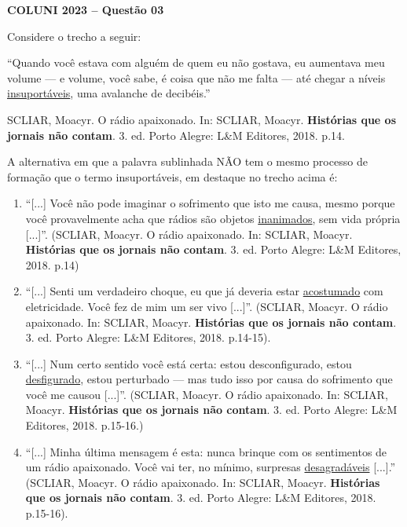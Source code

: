 \textbf{COLUNI 2023 -- Questão 03}\par\medskip Considere o trecho a seguir:

\par

“Quando você estava com alguém de quem eu não gostava, eu aumentava meu volume — e volume, você sabe, é coisa que não me falta — até chegar a níveis \underline{insuportáveis}, uma avalanche de decibéis.”

\par

SCLIAR, Moacyr. O rádio apaixonado. In: SCLIAR, Moacyr. \textbf{Histórias que os jornais não contam}. 3. ed. Porto Alegre: L\&M Editores, 2018. p.14.

\par

A alternativa em que a palavra sublinhada NÃO tem o mesmo processo de formação que o termo insuportáveis, em destaque no trecho acima é:\begin{enumerate}
\item “[...] Você não pode imaginar o sofrimento que isto me causa, mesmo porque você provavelmente acha
       que rádios são objetos \underline{inanimados}, sem vida própria [...]”. (SCLIAR, Moacyr. O rádio apaixonado. In: SCLIAR,
      Moacyr. \textbf{Histórias que os jornais não contam}. 3. ed. Porto Alegre: L\&M Editores, 2018. p.14)
\item “[...] Senti um verdadeiro choque, eu que já deveria estar \underline{acostumado} com eletricidade. Você fez de mim
       um ser vivo [...]”. (SCLIAR, Moacyr. O rádio apaixonado. In: SCLIAR, Moacyr. \textbf{Histórias que os jornais não contam}. 3. ed. Porto Alegre: L\&M Editores, 2018. p.14-15).
\item “[...] Num certo sentido você está certa: estou desconfigurado, estou \underline{desfigurado}, estou perturbado —
       mas tudo isso por causa do sofrimento que você me causou [...]”. (SCLIAR, Moacyr. O rádio apaixonado. In:
      SCLIAR, Moacyr. \textbf{Histórias que os jornais não contam}. 3. ed. Porto Alegre: L\&M Editores, 2018. p.15-16.)
\item “[...] Minha última mensagem é esta: nunca brinque com os sentimentos de um rádio apaixonado. Você
       vai ter, no mínimo, surpresas \underline{desagradáveis} [...].” (SCLIAR, Moacyr. O rádio apaixonado. In: SCLIAR, Moacyr.
      \textbf{Histórias que os jornais não contam}. 3. ed. Porto Alegre: L\&M Editores, 2018. p.15-16).\end{enumerate}
